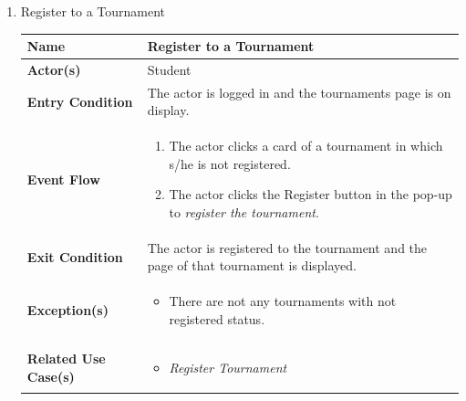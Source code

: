 \begin{enumerate}
\item Register to a Tournament
\begin{center}
    \begin{tabular}{ | m{10em} | m{10cm}| } 
      \hline
      \textbf{Name} & Register to a Tournament  \\ 
      \hline
      \textbf{Actor(s)} & Student \\ 
      \hline
      \textbf{Entry Condition} & The actor is logged in and the tournaments page is on display.\\ 
      \hline
      \textbf{Event Flow} & 
          \begin{enumerate}[(1)]
              \item The actor clicks a card of a tournament in which s/he is not registered.
              \item The actor clicks the Register button in the pop-up to \textit{register the tournament}.
          \end{enumerate}
      \\ 
      \hline
      \textbf{Exit Condition} & The actor is registered to the tournament and the page of that tournament is displayed.  \\ 
      \hline
      \textbf{Exception(s)} & 
      \begin{itemize}
          \item There are not any tournaments with not registered status.
      \end{itemize}
          \\ 
      \hline
      \textbf{Related Use Case(s)} & 
      \begin{itemize}
          \item \textit{Register Tournament}
      \end{itemize}
          \\ 
      \hline
    \end{tabular}
\end{center}


\newpage



\end{enumerate}
